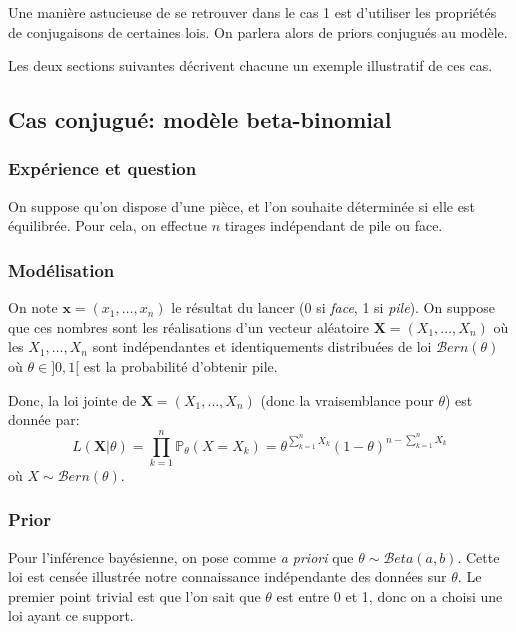 \documentclass[]{article}
\begin{document}
Une manière astucieuse de se retrouver dans le cas 1 est d'utiliser les
propriétés de conjugaisons de certaines lois. On parlera alors de priors
conjugués au modèle.

Les deux sections suivantes décrivent chacune un exemple illustratif de
ces cas.

\hypertarget{cas-conjuguuxe9-moduxe8le-beta-binomial}{%
\subsection{Cas conjugué: modèle
beta-binomial}\label{cas-conjuguuxe9-moduxe8le-beta-binomial}}

\hypertarget{expuxe9rience-et-question}{%
\subsubsection{Expérience et question}\label{expuxe9rience-et-question}}

On suppose qu'on dispose d'une pièce, et l'on souhaite déterminée si
elle est équilibrée. Pour cela, on effectue \(n\) tirages indépendant de
pile ou face.

\hypertarget{moduxe9lisation}{%
\subsubsection{Modélisation}\label{moduxe9lisation}}

On note \(\mathbf{x} = (x_1, \dots, x_n)\) le résultat du lancer (0 si
\emph{face}, 1 si \emph{pile}). On suppose que ces nombres sont les
réalisations d'un vecteur aléatoire \(\mathbf{X} = (X_1,\dots,X_{n})\)
où les \(X_1, \dots, X_n\) sont indépendantes et identiquements
distribuées de loi \(\mathcal{B}ern(\theta)\) où \(\theta \in ]0, 1[\)
est la probabilité d'obtenir pile.

Donc, la loi jointe de \(\mathbf{X} = (X_1,\dots,X_{n})\) (donc la
vraisemblance pour \(\theta\)) est donnée par:
\[L(\mathbf{X}\vert \theta) = \prod_{k = 1}^{n}\mathbb{P}_\theta(X = X_k) = \theta^{\sum_{k=1}^n X_k}\left(1 - \theta \right)^{n - \sum_{k=1}^n X_k}\]
où \(X \sim \mathcal{B}ern(\theta)\).

\hypertarget{prior}{%
\subsubsection{Prior}\label{prior}}

Pour l'inférence bayésienne, on pose comme \emph{a priori} que
\(\theta \sim \mathcal{B}eta(a, b)\). Cette loi est censée illustrée
notre connaissance indépendante des données sur \(\theta\). Le premier
point trivial est que l'on sait que \(\theta\) est entre 0 et 1, donc on
a choisi une loi ayant ce support.
\end{document}
